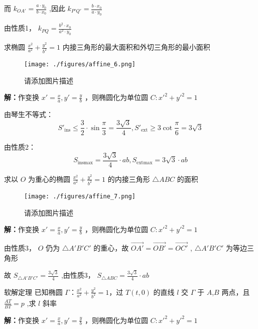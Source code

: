 \begin{corollary}{}
\begin{corollary}{}
而 $\displaystyle{k_{OA'}=\frac{a\cdot y_0}{b\cdot x_0}}$ ,因此 $\displaystyle{k_{P'Q'}=\frac{b\cdot x_0}{a\cdot y_0}}$

由性质1， $\displaystyle{k_{PQ}=\frac{b^2\cdot x_0}{a^2 \cdot y_0}}$ 
\end{corollary}
\begin{corollary}{}
求椭圆 $\displaystyle{\frac{x^2}{a^2}+\frac{y^2}{b^2}=1}$ 内接三角形的最大面积和外切三角形的最小面积
\begin{figure}[ht]
\centering
\texttt{[image: ./figures/affine\_6.png]}
\caption{请添加图片描述} \label{affine_fig6}
\end{figure}
\textbf{解：}作变换 $\displaystyle{x'=\frac{x}{a},y'=\frac{y}{b}}$ ，则椭圆化为单位圆 $\displaystyle{C:x'^2+y'^2=1}$

由琴生不等式：
$$S'_{\text{ins}}\leq \frac{3}{2}\cdot \sin\frac{\pi}{3}=\frac{3\sqrt{3}}{4}, S'_{\text{ext}}\geq 3\cot\frac{\pi}{6}=3\sqrt{3}$$ 

由性质2： 
$$S_{\text{ins}\max}=\frac{3\sqrt{3}}{4}\cdot ab, S_{\text{ext}\max}=3\sqrt{3}\cdot ab$$ 

\end{corollary}
\begin{corollary}{}
求以 $\displaystyle{O}$ 为重心的椭圆 $\displaystyle{\frac{x^2}{a^2}+\frac{y^2}{b^2}=1}$ 的内接三角形 $\displaystyle{\triangle ABC}$ 的面积
\begin{figure}[ht]
\centering
\texttt{[image: ./figures/affine\_7.png]}
\caption{请添加图片描述} \label{affine_fig7}
\end{figure}
\textbf{解：}作变换 $\displaystyle{x'=\frac{x}{a},y'=\frac{y}{b}}$ ，则椭圆化为单位圆 $\displaystyle{C:x'^2+y'^2=1}$

由性质3， $\displaystyle{O}$ 仍为 $\displaystyle{\triangle A'B'C'}$ 的重心，故 $\displaystyle{\vec{OA'}=\vec{OB'}=\vec{OC'}}$  , $\displaystyle{\triangle A'B'C'}$ 为等边三角形

故 $\displaystyle{S_{\triangle A'B'C'}=\frac{3\sqrt{3}}{4}}$ ,由性质3， $\displaystyle{S_{\triangle ABC}=\frac{3\sqrt{3}}{4}\cdot ab}$ 
\end{corollary}
\begin{corollary}{软解定理}
已知椭圆 $\displaystyle{\Gamma：\frac{x^2}{a^2}+\frac{y^2}{b^2}=1}$，过 $\displaystyle{T(t,0)}$ 的直线 $\displaystyle{l}$ 交 $\displaystyle{\Gamma}$ 于 $\displaystyle{A}$,$\displaystyle{B}$ 两点，且 $\displaystyle{\frac{AT}{BT}=p}$ ,求 $\displaystyle{l}$ 斜率

\textbf{解：}作变换 $\displaystyle{x'=\frac{x}{a},y'=\frac{y}{b}}$ ，则椭圆化为单位圆 $\displaystyle{C:x'^2+y'^2=1}$


\end{corollary}
\end{corollary}
